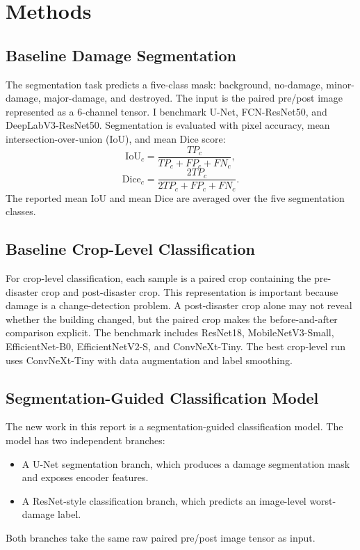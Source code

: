\documentclass[10pt,conference]{IEEEtran}
\begin{document}
\section{Methods}
\subsection{Baseline Damage Segmentation}
The segmentation task predicts a five-class mask: background, no-damage, minor-damage, major-damage, and destroyed. The input is the paired pre/post image represented as a 6-channel tensor. I benchmark U-Net, FCN-ResNet50, and DeepLabV3-ResNet50. Segmentation is evaluated with pixel accuracy, mean intersection-over-union (IoU), and mean Dice score:
\begin{equation}
    \mathrm{IoU}_c = \frac{TP_c}{TP_c + FP_c + FN_c},
\end{equation}
\begin{equation}
    \mathrm{Dice}_c = \frac{2TP_c}{2TP_c + FP_c + FN_c}.
\end{equation}
The reported mean IoU and mean Dice are averaged over the five segmentation classes.

\subsection{Baseline Crop-Level Classification}
For crop-level classification, each sample is a paired crop containing the pre-disaster crop and post-disaster crop. This representation is important because damage is a change-detection problem. A post-disaster crop alone may not reveal whether the building changed, but the paired crop makes the before-and-after comparison explicit. The benchmark includes ResNet18, MobileNetV3-Small, EfficientNet-B0, EfficientNetV2-S, and ConvNeXt-Tiny. The best crop-level run uses ConvNeXt-Tiny with data augmentation and label smoothing.

\subsection{Segmentation-Guided Classification Model}
The new work in this report is a segmentation-guided classification model. The model has two independent branches:
\begin{itemize}
    \item A U-Net segmentation branch, which produces a damage segmentation mask and exposes encoder features.
    \item A ResNet-style classification branch, which predicts an image-level worst-damage label.
\end{itemize}
Both branches take the same raw paired pre/post image tensor as input.
\end{document}
